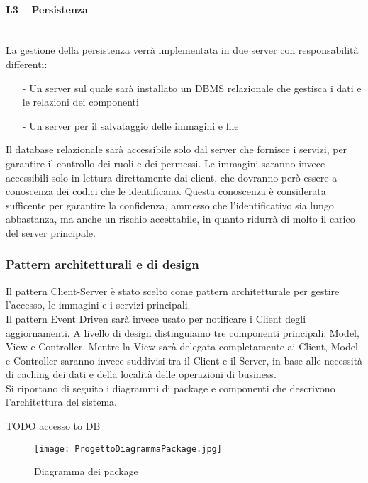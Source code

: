 \paragraph{L3 -- Persistenza}\mbox{}\\
La gestione della persistenza verrà implementata in due server con responsabilità differenti:
\begin{itemize}
    \item[-] Un server sul quale sarà installato un DBMS relazionale che gestisca i dati e le relazioni dei componenti
    \item[-] Un server per il salvataggio delle immagini e file
\end{itemize}

Il database relazionale sarà accessibile solo dal server che fornisce i servizi, per garantire il controllo dei ruoli e dei permessi.
Le immagini saranno invece accessibili solo in lettura direttamente dai client, che dovranno però essere a conoscenza dei codici che le identificano.
Questa conoscenza è considerata sufficente per garantire la confidenza, ammesso che l'identificativo sia lungo abbastanza,
ma anche un rischio accettabile, in quanto ridurrà di molto il carico del server principale.

\subsubsection{Pattern architetturali e di design}

Il pattern Client-Server è stato scelto come pattern architetturale per gestire l'accesso, le immagini e i servizi principali.\\
Il pattern Event Driven sarà invece usato per notificare i Client degli aggiornamenti.
A livello di design distinguiamo tre componenti principali: Model, View e Controller.
Mentre la View sarà delegata completamente ai Client, Model e Controller saranno invece suddivisi tra il Client e il Server,
in base alle necessità di caching dei dati e della località delle operazioni di business.\\
Si riportano di seguito i diagrammi di package e componenti che descrivono l'architettura del sistema.

\newpage
TODO accesso to DB
\begin{figure}[h!]
    \begin{center}
        \texttt{[image: ProgettoDiagrammaPackage.jpg]}
        \caption{Diagramma dei package}
    \end{center}
\end{figure}


